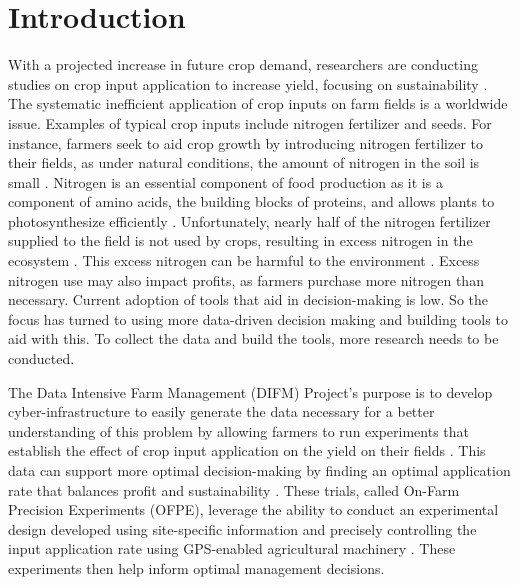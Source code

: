\documentclass[
  authoryear,
  preprint,
  3p]{elsarticle}
\begin{document}
\hypertarget{introduction}{%
\section{Introduction}\label{introduction}}

With a projected increase in future crop demand, researchers are
conducting studies on crop input application to increase yield, focusing
on sustainability \citep{tilman_sustainalbe_2011}. The systematic
inefficient application of crop inputs on farm fields is a worldwide
issue. Examples of typical crop inputs include nitrogen fertilizer and
seeds. For instance, farmers seek to aid crop growth by introducing
nitrogen fertilizer to their fields, as under natural conditions, the
amount of nitrogen in the soil is small \citep{gruber_nitrogen_2008}.
Nitrogen is an essential component of food production as it is a
component of amino acids, the building blocks of proteins, and allows
plants to photosynthesize efficiently \citep{MAHESWARI2017175}.
Unfortunately, nearly half of the nitrogen fertilizer supplied to the
field is not used by crops, resulting in excess nitrogen in the
ecosystem \citep{billen_nitrogen_2013}. This excess nitrogen can be
harmful to the environment
\citep{NIKOLENKO20181415, menegat-nitrogen-2021}. Excess nitrogen use
may also impact profits, as farmers purchase more nitrogen than
necessary. Current adoption of tools that aid in decision-making is low.
So the focus has turned to using more data-driven decision making and
building tools to aid with this. To collect the data and build the
tools, more research needs to be conducted.

The Data Intensive Farm Management (DIFM) Project's purpose is to
develop cyber-infrastructure to easily generate the data necessary for a
better understanding of this problem by allowing farmers to run
experiments that establish the effect of crop input application on the
yield on their fields \citep{bullock-grant-2019}. This data can support
more optimal decision-making by finding an optimal application rate that
balances profit and sustainability
\citep{kyveryga-farm-2019, value-on-farm-2020}. These trials, called
On-Farm Precision Experiments (OFPE), leverage the ability to conduct an
experimental design developed using site-specific information and
precisely controlling the input application rate using GPS-enabled
agricultural machinery \citep{bullock-grant-2019}. These experiments
then help inform optimal management decisions.
\end{document}
